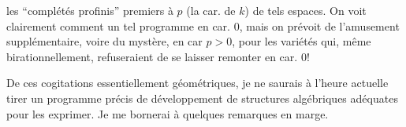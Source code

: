 %
les ``complétés profinis''  premiers à $p$ (la car. de $k$) de tels espaces.
On voit clairement comment  un tel programme en car. $0$, mais on prévoit de l'amusement supplémentaire, voire du mystère, en car $p>0$, pour les variétés qui, même birationnellement, refuseraient de se laisser remonter en car. $0$!


De ces cogitations essentiellement géométriques, je ne saurais à l'heure actuelle tirer un programme précis de développement de structures algébriques adéquates pour les exprimer.
Je me bornerai à quelques remarques en marge.

